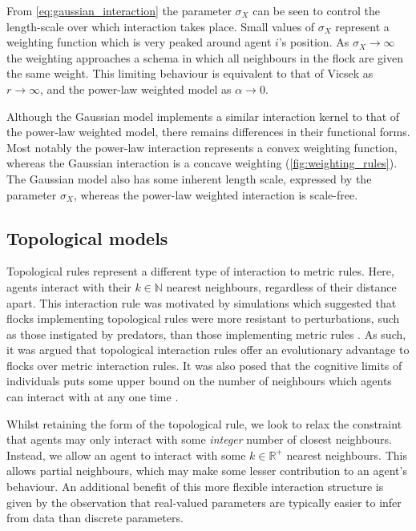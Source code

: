From \cref{eq:gaussian_interaction} the parameter $\sigma_X$ can be seen to
control the length-scale over which interaction takes place. Small values of
$\sigma_X$ represent a weighting function which is very peaked around agent
$i$'s position. As $\sigma_X \rightarrow \infty$ the weighting approaches a
schema in which all neighbours in the flock are given the same weight. This
limiting behaviour is equivalent to that of Vicsek as $r\rightarrow\infty$, and
the power-law weighted model as $\alpha\rightarrow0$.

Although the Gaussian model implements a similar interaction kernel to that of
the power-law weighted model, there remains differences in their functional
forms. Most notably the power-law interaction represents a convex weighting
function, whereas the Gaussian interaction is a concave weighting
(\cref{fig:weighting_rules}). The Gaussian model also has some inherent length
scale, expressed by the parameter $\sigma_X$, whereas the power-law weighted
interaction is scale-free.

\subsection{Topological models}

Topological rules represent a different type of interaction to metric rules.
Here, agents interact with their $k\in\mathbb{N}$ nearest neighbours,
regardless of their distance apart. This interaction rule was motivated by
simulations which suggested that flocks implementing topological rules were
more resistant to perturbations, such as those instigated by predators, than
those implementing metric rules \parencite{ballerini08,ginelli10,camperi12}. As
such, it was argued that topological interaction rules offer an evolutionary
advantage to flocks over metric interaction rules. It was also posed that the
cognitive limits of individuals puts some upper bound on the number of
neighbours which agents can interact with at any one time
\parencite{nieder05,giardina08}.

Whilst retaining the form of the topological rule, we look to relax the
constraint that agents may only interact with some \emph{integer} number of
closest neighbours. Instead, we allow an agent to interact with some
$k\in\mathbb{R}^+$ nearest neighbours. This allows partial neighbours, which
may make some lesser contribution to an agent's behaviour. An additional
benefit of this more flexible interaction structure is given by the observation
that real-valued parameters are typically easier to infer from data than
discrete parameters.

